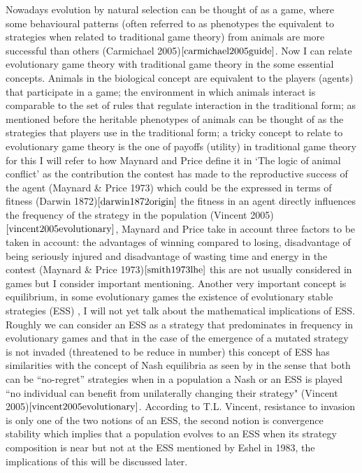 \documentclass{article}
\begin{document}
Nowadays evolution by natural selection can be thought of as a game, where some behavioural patterns (often referred to as phenotypes the equivalent to strategies when related to traditional game theory) from animals are more successful than others (Carmichael 2005)$\cite{carmichael2005guide}$. Now I can relate evolutionary game theory with traditional game theory in the some essential concepts. Animals in the biological concept are equivalent to the players (agents) that participate in a game; the environment in which animals interact is comparable to the set of rules that regulate interaction in the traditional form; as mentioned before the heritable phenotypes of animals can be thought of as the strategies that players use in the traditional form; a tricky concept to relate to evolutionary game theory is the one of payoffs (utility) in traditional game theory  for this I will refer to how Maynard and Price define it in ‘The logic of animal conflict’ as the contribution the contest has made to the reproductive success of the agent (Maynard \& Price 1973) which could be the expressed in terms of fitness  (Darwin 1872)$\cite{darwin1872origin}$ the fitness in an agent directly influences the frequency of the strategy in the population (Vincent 2005)$\cite{vincent2005evolutionary}$, Maynard and Price take in account three factors to be taken in account: the advantages of winning compared to losing, disadvantage of being seriously injured and disadvantage of wasting time and energy in the contest (Maynard \& Price 1973)$\cite{smith1973lhe}$ this are not usually considered in games but I consider important mentioning. Another very important concept is equilibrium, in some evolutionary games the existence of evolutionary stable strategies (ESS) , I will not yet talk about the mathematical implications of  ESS. Roughly we can consider an ESS as a strategy that predominates in frequency in evolutionary games and that in the case of the emergence of a mutated strategy is not invaded (threatened to be reduce in number) this concept of ESS has similarities with the concept of Nash equilibria as seen by in the sense that both can be ``no-regret'' strategies when in a population a Nash or an ESS is played ``no individual can benefit from unilaterally changing their strategy" (Vincent 2005)$\cite{vincent2005evolutionary}$. According to T.L. Vincent, resistance to invasion is only one of the two notions of an ESS, the second notion is convergence stability which implies that a population evolves to an ESS when its strategy composition is near but not at the ESS mentioned by Eshel in 1983, the implications of this will be discussed later. 
\end{document}
